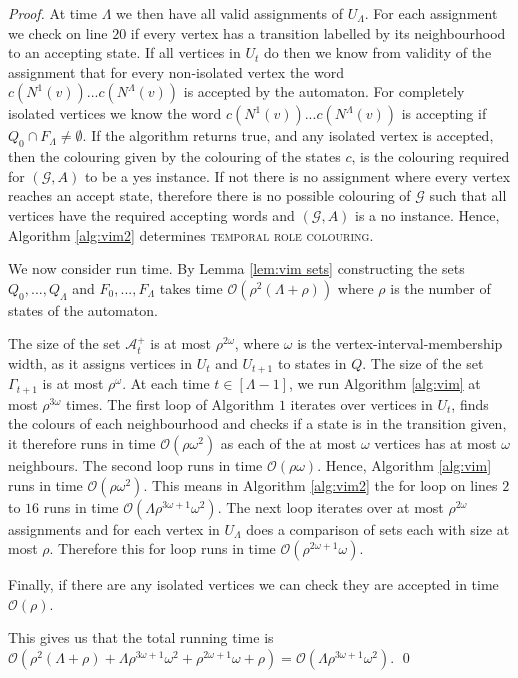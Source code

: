 \documentclass[runningheads]{llncs}
\begin{document}
\begin{proof}
At time $\Lambda$ we then have all valid assignments of $U_\Lambda$. For each assignment we check on line $20$ if every vertex has a transition labelled by its neighbourhood to an accepting state. If all vertices in $U_t$ do then we know from validity of the assignment that for every non-isolated vertex the word $c(N^1(v))...c(N^\Lambda(v))$ is accepted by the automaton. For completely isolated vertices we know the word  $c(N^1(v))...c(N^\Lambda(v))$ is accepting if $Q_0 \cap F_\Lambda \neq \emptyset$. If the algorithm returns true, and any isolated vertex is accepted, then the colouring given by the colouring of the states $c$, is the colouring required for $(\mathcal{G},A)$ to be a yes instance.
If not there is no assignment where every vertex reaches an accept state, therefore there is no possible colouring of $\mathcal{G}$ such that all vertices have the required accepting words and $(\mathcal{G},A)$ is a no instance.
Hence, Algorithm \ref{alg:vim2} determines \textsc{temporal role colouring}.

We now consider run time. 
By Lemma \ref{lem:vim sets} constructing the sets $Q_0,...,Q_\Lambda$ and $F_0,...,F_\Lambda$ takes time $\mathcal{O}(\rho^2(\Lambda+\rho))$ where $\rho$ is the number of states of the automaton.

The size of the set $\mathcal{A}^+_t$ is at most $\rho^{2\omega}$, where $\omega$ is the vertex-interval-membership width, as it assigns vertices in $U_t$ and $U_{t+1}$ to states in $Q$. The size of the set $\Gamma_{t+1}$ is at most $\rho^\omega$.
At each time $t \in [\Lambda-1]$, we run Algorithm \ref{alg:vim} at most $\rho^{3\omega}$ times. 
The first loop of Algorithm $1$ iterates over vertices in $U_t$, finds the colours of each neighbourhood and checks if a state is in the transition given, it therefore runs in time $\mathcal{O}(\rho\omega^2)$ as each of the at most $\omega$ vertices has at most $\omega$ neighbours.
The second loop runs in time $\mathcal{O}(\rho\omega)$. Hence, Algorithm \ref{alg:vim} runs in time $\mathcal{O}(\rho\omega^2)$.
This means in Algorithm \ref{alg:vim2} the for loop on lines $2$ to $16$ runs in time $\mathcal{O}(\Lambda\rho^{3\omega+1}\omega^2)$.
The next loop iterates over at most $\rho^{2\omega}$ assignments and for each vertex in $U_\Lambda$ does a comparison of sets each with size at most $\rho$. Therefore this for loop runs in time $\mathcal{O}(\rho^{2\omega+1}\omega)$.

Finally, if there are any isolated vertices we can check they are accepted in time $\mathcal{O}(\rho)$.

This gives us that the total running time is $\mathcal{O}(\rho^2(\Lambda+\rho)+\Lambda\rho^{3\omega+1}\omega^2+\rho^{2\omega+1}\omega+\rho)= \mathcal{O}(\Lambda\rho^{3\omega+1}\omega^2)$.
\qed \end{proof} 
\end{document}
